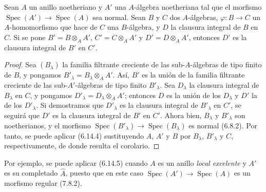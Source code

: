 \begin{corollary}[6.14.5]
\label{IV.2.s6.14.5-fr}
Sean $A$ un anillo noetheriano y $A'$ una $A$-álgebra noetheriana
tal que el morfismo $\operatorname{Spec}(A')\to\operatorname{Spec}(A)$
sea normal. Sean $B$ y $C$ dos $A$-álgebras,
$\varphi:B\to C$ un $A$-homomorfismo que hace de $C$ una
$B$-álgebra, y $D$ la clausura integral de $B$ en $C$. Si se pone
$B'=B\otimes_A A'$, $C'=C\otimes_A A'$ y $D'=D\otimes_A A'$,
entonces $D'$ es la clausura integral de $B'$ en $C'$.
\end{corollary}

\begin{proof}
Sea $(B_\lambda)$ la familia filtrante creciente de las
sub-$A$-álgebras de tipo finito de $B$, y pongamos
$B'_\lambda=B_\lambda\otimes_A A'$. Así, $B'$ es la unión de la
familia filtrante creciente de las sub-$A'$-álgebras de tipo finito
$B'_\lambda$. Sea $D_\lambda$ la clausura integral de $B_\lambda$
en $C$, y pongamos $D'_\lambda=D_\lambda\otimes_A A'$; entonces
$D$ es la unión de los $D_\lambda$ y $D'$ la de los $D'_\lambda$.
Si demostramos que $D'_\lambda$ es la clausura integral de
$B'_\lambda$ en $C'$, se seguirá que $D'$ es la clausura integral
de $B'$ en $C'$. Ahora bien, $B_\lambda$ y $B'_\lambda$ son
noetherianos, y el morfismo
$\operatorname{Spec}(B'_\lambda)\to\operatorname{Spec}(B_\lambda)$
es normal (6.8.2). Por tanto, se puede aplicar (6.14.4) sustituyendo
$A$, $A'$ y $B$ por $B_\lambda$, $B'_\lambda$ y $C$,
respectivamente, de donde resulta el corolario.
\end{proof}

Por ejemplo, se puede aplicar (6.14.5) cuando $A$ es un anillo \emph{local excelente} y $A'$ es su completado $\widehat A$, puesto que
en este caso $\operatorname{Spec}(A')\to\operatorname{Spec}(A)$
es un morfismo regular (7.8.2).
